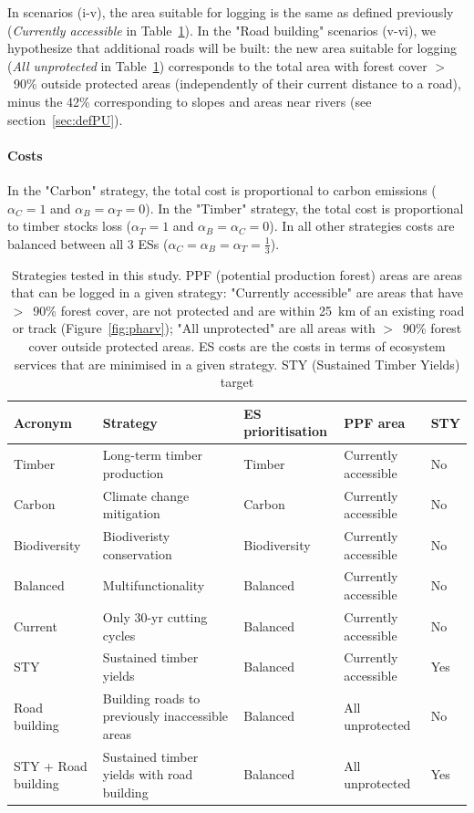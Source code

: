 \documentclass{article}
\begin{document}
In scenarios (i-v), the area suitable for logging is the same as defined previously (\textit{Currently accessible} in Table~\ref{tab:strategies}). In the "Road building" scenarios (v-vi), we hypothesize that additional roads will be built: the new area suitable for logging (\textit{All unprotected} in Table~\ref{tab:strategies}) corresponds to the total area with forest cover $>$~90\% outside protected areas (independently of their current distance to a road), minus the 42\% corresponding to slopes and areas near rivers (see section~\ref{sec:defPU}). 

\paragraph{Costs}

In the "Carbon" strategy, the total cost is proportional to carbon emissions ($\alpha_C=1$ and $\alpha_B=\alpha_T=0$). In the "Timber" strategy, the total cost is proportional to timber stocks loss ($\alpha_T=1$ and $\alpha_B=\alpha_C=0$). In all other strategies costs are balanced between all 3 ESs ($\alpha_C=\alpha_B=\alpha_T=\frac{1}{3}$).

\begin{table}
    \centering
    \begin{tabularx}{\textwidth}{p{2cm} p{3cm} p{2cm} p{2cm} p{0.8cm}}
    \toprule
         Acronym & Strategy & ES prioritisation & PPF area &  STY \\
         \midrule
         Timber & Long-term timber production & Timber  & Currently accessible& No \\
         Carbon & Climate change mitigation &  Carbon & Currently accessible & No \\
         Biodiversity & Biodiveristy conservation &  Biodiversity & Currently accessible & No \\
         Balanced & Multifunctionality & Balanced & Currently accessible & No \\
         Current & Only 30-yr cutting cycles & Balanced & Currently accessible & No \\
         STY & Sustained timber yields & Balanced & Currently accessible & Yes \\
         Road building & Building roads to previously inaccessible areas & Balanced & All unprotected & No \\
         STY + Road building & Sustained timber yields with road building & Balanced & All unprotected & Yes \\
         \bottomrule
    \end{tabularx}
    \caption{Strategies tested in this study. PPF (potential production forest) areas are areas that can be logged in a given strategy: "Currently accessible" are areas that have $>$~90\% forest cover, are not protected and are within 25~km of an existing road or track (Figure~\ref{fig:pharv}); "All unprotected" are all areas with $>$~90\% forest cover outside protected areas. ES costs are the costs in terms of ecosystem services that are minimised in a given strategy. STY (Sustained Timber Yields) target }
    \label{tab:strategies}
\end{table}
\end{document}
